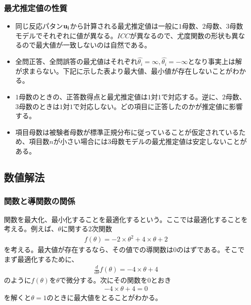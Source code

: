 \documentclass[12pt]{jarticle}
\begin{document}
\subsubsection{最尤推定値の性質}
\begin{itemize}
  \item 同じ反応パタン$\displaystyle \bf u_i$から計算される最尤推定値は一般に$1$母数、$2$母数、$3$母数モデルでそれぞれに値が異なる。$ICC$が異なるので、尤度関数の形状も異なるので最大値が一致しないのは自然である。
  \item 全問正答、全問誤答の最尤値はそれぞれ$\hat{\theta_i} = \infty,\hat{\theta_i} = -\infty$となり事実上は解が求まらない。下記に示した表より最大値、最小値が存在しないことがわかる。
  \item $1$母数のときの、正答数得点と最尤推定値は$1$対$1$で対応する。逆に、$2$母数、$3$母数のときは$1$対$1$で対応しない。どの項目に正答したのかが推定値に影響する。
  \item 項目母数は被験者母数が標準正規分布に従っていることが仮定されているため、項目数$n$が小さい場合には$3$母数モデルの最尤推定値は安定しないことがある。
\end{itemize}
\subsection{数値解法}
\subsubsection{関数と導関数の関係}
関数を最大化、最小化することを最適化するという。ここでは最適化することを考える。例えば、$\theta$に関する$2$次関数
\begin{eqnarray}
  \label{03}
  \displaystyle f(\theta) = -2 \times \theta^2 +4 \times \theta + 2
\end{eqnarray}
を考える。最大値が存在するなら、その値での導関数は$0$のはずである。そこでまず最適化するために、
\begin{eqnarray}
  \label{04}
  \displaystyle \frac{d}{d\theta}f(\theta) = -4 \times \theta +4
\end{eqnarray}
のように$f(\theta)$を$\theta$で微分する。次にその関数を$0$とおき
\begin{eqnarray}
  \label{05}
  \displaystyle  -4 \times \theta +4 = 0
\end{eqnarray}
を解くと$\theta = 1$のときに最大値をとることがわかる。
\end{document}
